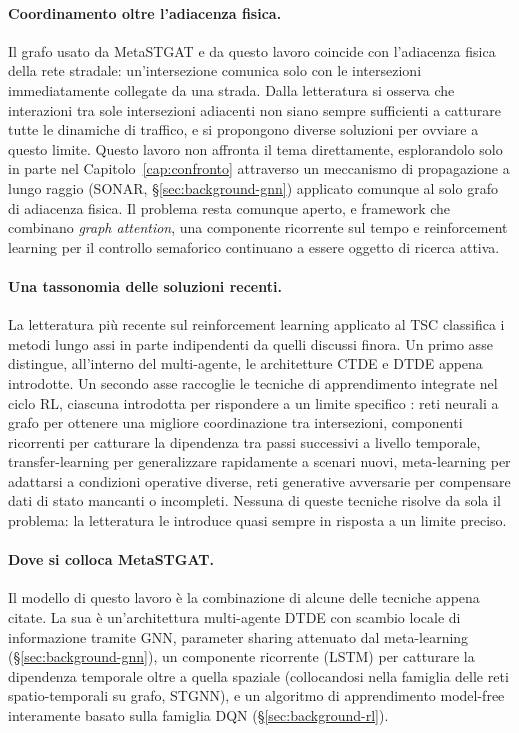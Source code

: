 \paragraph{Coordinamento oltre l'adiacenza fisica.} Il grafo usato da
MetaSTGAT e da questo lavoro coincide con l'adiacenza fisica della rete
stradale: un'intersezione comunica solo con le intersezioni immediatamente
collegate da una strada. Dalla letteratura si osserva che interazioni tra
sole intersezioni adiacenti non siano sempre sufficienti a catturare tutte
le dinamiche di traffico, e si propongono diverse soluzioni per ovviare a
questo limite. Questo lavoro non affronta il tema direttamente,
esplorandolo solo in parte nel Capitolo~\ref{cap:confronto} attraverso un
meccanismo di propagazione a lungo raggio (SONAR,
§\ref{sec:background-gnn}) applicato comunque al solo grafo di adiacenza
fisica. Il problema resta comunque aperto, e framework che combinano
\emph{graph attention}, una componente ricorrente sul tempo e
reinforcement learning per il controllo semaforico continuano a essere
oggetto di ricerca attiva.

\paragraph{Una tassonomia delle soluzioni recenti.} La letteratura più
recente sul reinforcement learning applicato al TSC classifica i metodi
lungo assi in parte indipendenti da quelli discussi finora. Un primo asse
distingue, all'interno del multi-agente, le architetture CTDE e DTDE
appena introdotte. Un secondo asse raccoglie le tecniche di apprendimento
integrate nel ciclo RL, ciascuna introdotta per rispondere a un limite
specifico \citep{xiao2025tscreview, wei2020tscsurvey}: reti neurali a
grafo per ottenere una migliore coordinazione tra intersezioni, componenti
ricorrenti per catturare la dipendenza tra passi successivi a livello
temporale, transfer-learning per generalizzare rapidamente a scenari
nuovi, meta-learning per adattarsi a condizioni operative diverse, reti
generative avversarie per compensare dati di stato mancanti o incompleti.
Nessuna di queste tecniche risolve da sola il problema: la letteratura le
introduce quasi sempre in risposta a un limite preciso.

\paragraph{Dove si colloca MetaSTGAT.} Il modello di questo lavoro è la
combinazione di alcune delle tecniche appena citate. La sua è
un'architettura multi-agente DTDE con scambio locale di informazione
tramite GNN, parameter sharing attenuato dal meta-learning
(§\ref{sec:background-gnn}), un componente ricorrente (LSTM) per
catturare la dipendenza temporale oltre a quella spaziale
(collocandosi nella famiglia delle reti spatio-temporali su grafo,
STGNN), e un algoritmo di apprendimento model-free interamente basato
sulla famiglia DQN (§\ref{sec:background-rl}).

